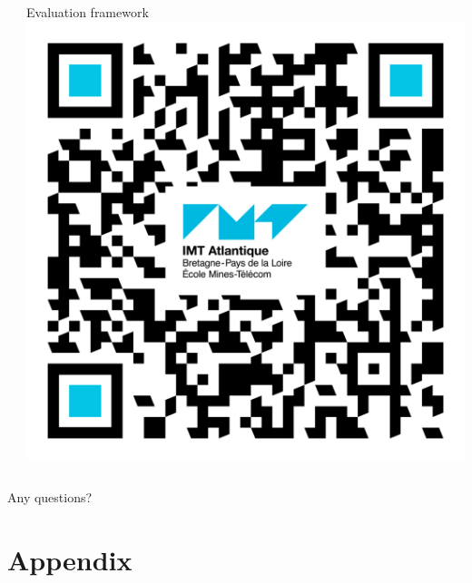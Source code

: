 \documentclass[color,t,presentation,english,aspectratio=169]{beamer}
\begin{document}
\begin{frame}
\begin{columns}
\begin{column}{.25\textwidth}
		\end{column}
		\hfil\hfil
		\begin{column}{.25\textwidth}
			\centering
			\small Evaluation framework\\
			\includegraphics[width=.8\linewidth]{figures/qr-eiffel.png}
		\end{column}
	\end{columns}
	\vspace{4ex}
	\centering\Large Any questions?


\end{frame}

\section*{Appendix}
\end{document}
